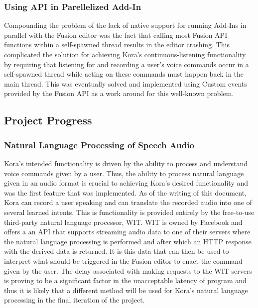 \documentclass[onecolumn, draftclsnofoot,10pt, compsoc]{IEEEtran}
\begin{document}
    	\subsubsection{Using API in Parellelized Add-In}
		    Compounding the problem of the lack of native support for running Add-Ins in parallel with the Fusion editor was the fact that calling most Fusion API functions within a self-spawned thread results in the editor crashing.
		    This complicated the solution for achieving Kora’s continuous-listening functionality by requiring that listening for and recording a user’s voice commands occur in a self-spawned thread while acting on these commands must happen back in the main thread.
		    This was eventually solved and implemented using Custom events provided by the Fusion API as a work around for this well-known problem.


	\subsection{Project Progress}
    	\subsubsection{Natural Language Processing of Speech Audio}
		    Kora’s intended functionality is driven by the ability to process and understand voice commands given by a user.
		    Thus, the ability to process natural language given in an audio format is crucial to achieving Kora’s desired functionality and was the first feature that was implemented.
		    As of the writing of this document, Kora can record a user speaking and can translate the recorded audio into one of several learned intents.
		    This is functionality is provided entirely by the free-to-use third-party natural language processor, WIT.
		    WIT is owned by Facebook and offers a an API that supports streaming audio data to one of their servers where the natural language processing is performed and after which an HTTP response with the derived data is returned.
		    It is this data that can then be used to interpret what should be triggered in the Fusion editor to enact the command given by the user.
		    The delay associated with making requests to the WIT servers is proving to be a significant factor in the unacceptable latency of program and thus it is likely that a different method will be used for Kora’s natural language processing in the final iteration of the project.
 
\end{document}
